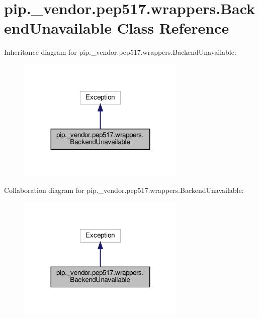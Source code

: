 \hypertarget{classpip_1_1__vendor_1_1pep517_1_1wrappers_1_1BackendUnavailable}{}\section{pip.\+\_\+vendor.\+pep517.\+wrappers.\+Backend\+Unavailable Class Reference}
\label{classpip_1_1__vendor_1_1pep517_1_1wrappers_1_1BackendUnavailable}


Inheritance diagram for pip.\+\_\+vendor.\+pep517.\+wrappers.\+Backend\+Unavailable\+:
\nopagebreak
\begin{figure}[H]
\begin{center}
\leavevmode
\includegraphics[width=227pt]{classpip_1_1__vendor_1_1pep517_1_1wrappers_1_1BackendUnavailable__inherit__graph}
\end{center}
\end{figure}


Collaboration diagram for pip.\+\_\+vendor.\+pep517.\+wrappers.\+Backend\+Unavailable\+:
\nopagebreak
\begin{figure}[H]
\begin{center}
\leavevmode
\includegraphics[width=227pt]{classpip_1_1__vendor_1_1pep517_1_1wrappers_1_1BackendUnavailable__coll__graph}
\end{center}
\end{figure}
